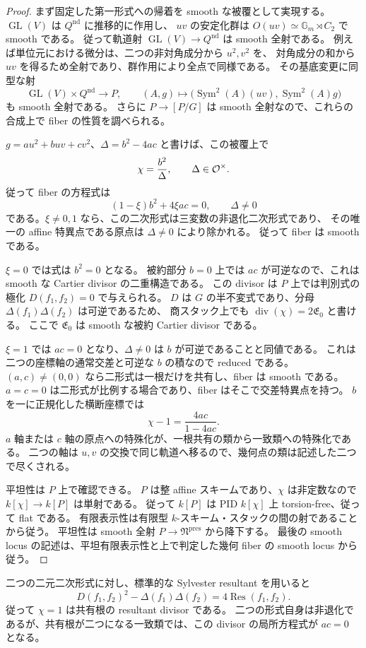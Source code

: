 \begin{proof}
まず固定した第一形式への帰着を smooth な被覆として実現する。
$\operatorname{GL}(V)$ は $Q^{\mathrm{nd}}$ に推移的に作用し、
$uv$ の安定化群は $O(uv)\simeq\mathbb G_m\rtimes C_2$ で smooth である。
従って軌道射 $\operatorname{GL}(V)\to Q^{\mathrm{nd}}$ は smooth 全射である。
例えば単位元における微分は、二つの非対角成分から $u^2,v^2$ を、
対角成分の和から $uv$ を得るため全射であり、群作用により全点で同様である。
その基底変更に同型な射
\[
 \operatorname{GL}(V)\times Q^{\mathrm{nd}}\longrightarrow P,
 \qquad (A,g)\longmapsto
 \bigl(\operatorname{Sym}^2(A)(uv),\operatorname{Sym}^2(A)g\bigr)
\]
も smooth 全射である。
さらに $P\to[P/G]$ は smooth 全射なので、これらの合成上で fiber の性質を調べられる。

$g=au^2+buv+cv^2$、$\Delta=b^2-4ac$ と書けば、この被覆上で
\[
 \chi=\frac{b^2}{\Delta},\qquad \Delta\in\mathcal O^\times.
\]
従って fiber の方程式は
\begin{equation}\label{eq:moduli-noncubic-fiber-quadric}
 (1-\xi)b^2+4\xi ac=0,\qquad \Delta\ne0
\end{equation}
である。$\xi\ne0,1$ なら、この二次形式は三変数の非退化二次形式であり、
その唯一の affine 特異点である原点は $\Delta\ne0$ により除かれる。
従って fiber は smooth である。

$\xi=0$ では式は $b^2=0$ となる。
被約部分 $b=0$ 上では $ac$ が可逆なので、これは smooth な Cartier divisor の二重構造である。
この divisor は $P$ 上では判別式の極化 $D(f_1,f_2)=0$ で与えられる。
$D$ は $G$ の半不変式であり、分母 $\Delta(f_1)\Delta(f_2)$ は可逆であるため、
商スタック上でも $\operatorname{div}(\chi)=2\mathfrak E_0$ と書ける。
ここで $\mathfrak E_0$ は smooth な被約 Cartier divisor である。

$\xi=1$ では $ac=0$ となり、$\Delta\ne0$ は $b$ が可逆であることと同値である。
これは二つの座標軸の通常交差と可逆な $b$ の積なので reduced である。
$(a,c)\ne(0,0)$ なら二形式は一根だけを共有し、fiber は smooth である。
$a=c=0$ は二形式が比例する場合であり、fiber はそこで交差特異点を持つ。
$b$ を一に正規化した横断座標では
\begin{equation}\label{eq:moduli-noncubic-chi-coincident-node}
 \chi-1=\frac{4ac}{1-4ac}.
\end{equation}
$a$ 軸または $c$ 軸の原点への特殊化が、一根共有の類から一致類への特殊化である。
二つの軸は $u,v$ の交換で同じ軌道へ移るので、幾何点の類は記述した二つで尽くされる。

平坦性は $P$ 上で確認できる。
$P$ は整 affine スキームであり、$\chi$ は非定数なので $k[\chi]\to k[P]$ は単射である。
従って $k[P]$ は PID $k[\chi]$ 上 torsion-free、従って flat である。
有限表示性は有限型 $k$-スキーム・スタックの間の射であることから従う。
平坦性は smooth 全射 $P\to\mathfrak N^{\mathrm{pres}}$ から降下する。
最後の smooth locus の記述は、平坦有限表示性と上で判定した幾何 fiber の smooth locus から従う。
\end{proof}

\begin{remark}
二つの二元二次形式に対し、標準的な Sylvester resultant を用いると
\[
 D(f_1,f_2)^2-\Delta(f_1)\Delta(f_2)=4\operatorname{Res}(f_1,f_2).
\]
従って $\chi=1$ は共有根の resultant divisor である。
二つの形式自身は非退化であるが、共有根が二つになる一致類では、この divisor の局所方程式が $ac=0$ となる。
\end{remark}